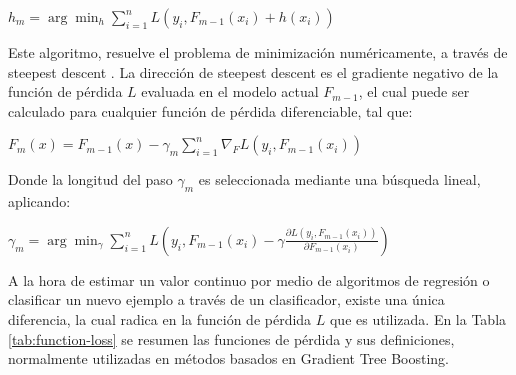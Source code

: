\begin{center}
	$h_m =  \arg\min_{h} \sum_{i=1}^{n} L(y_i, F_{m-1}(x_i) + h(x_i))$
\end{center}

Este algoritmo, resuelve el problema de minimización numéricamente, a través de steepest descent \cite{battiti1992first}. La dirección de steepest descent es el gradiente negativo de la función de pérdida $L$ evaluada en el modelo actual $F_{m-1}$, el cual puede ser calculado para cualquier función de pérdida diferenciable, tal que:

\begin{center}
	$F_m(x) = F_{m-1}(x) - \gamma_m \sum_{i=1}^{n} \nabla_F L(y_i, F_{m-1}(x_i))$
\end{center}

Donde la longitud del paso $\gamma_{m}$ es seleccionada mediante una búsqueda lineal, aplicando:

\begin{center}
	$\gamma_m = \arg\min_{\gamma} \sum_{i=1}^{n} L(y_i, F_{m-1}(x_i) - \gamma \frac{\partial L(y_i, F_{m-1}(x_i))}{\partial F_{m-1}(x_i)})$
\end{center}

A la hora de estimar un valor continuo por medio de algoritmos de regresión o clasificar un nuevo ejemplo a través de un clasificador, existe una única diferencia, la cual radica en la función de pérdida $L$ que es utilizada. En la Tabla \ref{tab:function-loss} se resumen las funciones de pérdida y sus definiciones, normalmente utilizadas en métodos basados en Gradient Tree Boosting.

